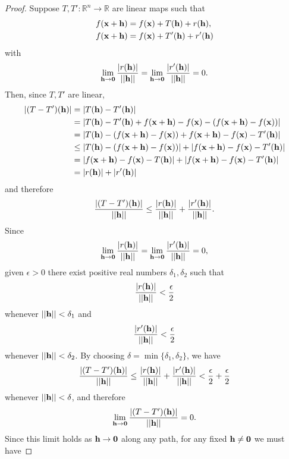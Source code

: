 \documentclass[12pt,letterpaper,reqno]{article}
\numberwithin{equation}{section}
\newcommand{\bh}{{\bf h}}
\newcommand{\R}{\ensuremath{\mathbb R}}
\newcommand{\zv}{{\bf 0}}
\newcommand{\bx}{{\bf x}}
\begin{document}
{\begin{proof}
	Suppose $T,T':\R^n \to \R$ are linear maps such that 
	\begin{align*}
		f(\bx+\bh)&=f(\bx)+T(\bh)+r(\bh), \\
		f(\bx+\bh)&=f(\bx)+T'(\bh)+r'(\bh)
	\end{align*}
	with
	\begin{align*}
		\lim_{\bh \to \zv}\frac{|r(\bh)|}{||\bh||}=\lim_{\bh \to \zv}\frac{|r'(\bh)|}{||\bh||}=0.
	\end{align*}
	Then, since $T,T'$ are linear,
	\begin{align*}
		|(T-T')(\bh)|&=|T(\bh)-T'(\bh)| \\
		&=|T(\bh)-T'(\bh)+f(\bx+\bh)-f(\bx)-(f(\bx+\bh)-f(\bx))| \\
		&=|T(\bh)-(f(\bx+\bh)-f(\bx))+f(\bx+\bh)-f(\bx)-T'(\bh)| \\
		&\leq |T(\bh)-(f(\bx+\bh)-f(\bx))|+|f(\bx+\bh)-f(\bx)-T'(\bh)| \\
		&= |f(\bx+\bh)-f(\bx)-T(\bh)|+|f(\bx+\bh)-f(\bx)-T'(\bh)| \\
		&=|r(\bh)|+|r'(\bh)|
	\end{align*}
	and therefore
\begin{align*}
	\frac{|(T-T')(\bh)|}{||\bh||}\leq \frac{|r(\bh)|}{||\bh||}+ \frac{|r'(\bh)|}{||\bh||}.
\end{align*}
	Since 
\begin{align*}
		\lim_{\bh \to \zv}\frac{|r(\bh)|}{||\bh||}=\lim_{\bh \to \zv}\frac{|r'(\bh)|}{||\bh||}=0,
	\end{align*}	
given $\epsilon>0$ there exist positive real numbers $\delta_1,\delta_2$ such that 
	\begin{align*}
		\frac{|r(\bh)|}{||\bh||}<\frac{\epsilon}{2}
	\end{align*}
	whenever $||\bh||<\delta_1$ and 
	\begin{align*}
		\frac{|r'(\bh)|}{||\bh||}<\frac{\epsilon}{2}
	\end{align*}
	whenever $||\bh||<\delta_2$. By choosing $\delta=\min\{\delta_1,\delta_2\}$, we have
	\begin{align*}
		\frac{|(T-T')(\bh)|}{||\bh||}\leq \frac{|r(\bh)|}{||\bh||}+ \frac{|r'(\bh)|}{||\bh||}<\frac{\epsilon}{2}+\frac{\epsilon}{2}
	\end{align*}
	whenever $||\bh||<\delta$, and therefore
	\begin{align*}
		\lim_{\bh \to \zv}\frac{|(T-T')(\bh)|}{||\bh||}=0.
	\end{align*}
Since this limit holds as $\bh \to \zv$ along any path, for any fixed $\bh \neq \zv$ we must have

\end{proof}}
\end{document}
